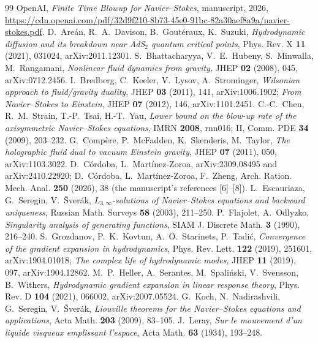 \begin{thebibliography}{99}
\small
{} OpenAI, \emph{Finite Time Blowup for Navier--Stokes}, manuscript, 2026, \url{https://cdn.openai.com/pdf/32d9f210-8b73-45e0-91bc-82a30aef8a9a/navier-stokes.pdf}.
 D.~Areán, R.~A.~Davison, B.~Goutéraux, K.~Suzuki, \emph{Hydrodynamic diffusion and its breakdown near AdS$_2$ quantum critical points}, Phys. Rev. X \textbf{11} (2021), 031024, arXiv:2011.12301.
 S.~Bhattacharyya, V.~E.~Hubeny, S.~Minwalla, M.~Rangamani, \emph{Nonlinear fluid dynamics from gravity}, JHEP \textbf{02} (2008), 045, arXiv:0712.2456.
 I.~Bredberg, C.~Keeler, V.~Lysov, A.~Strominger, \emph{Wilsonian approach to fluid/gravity duality}, JHEP \textbf{03} (2011), 141, arXiv:1006.1902; \emph{From Navier--Stokes to Einstein}, JHEP \textbf{07} (2012), 146, arXiv:1101.2451.
 C.-C.~Chen, R.~M.~Strain, T.-P.~Tsai, H.-T.~Yau, \emph{Lower bound on the blow-up rate of the axisymmetric Navier--Stokes equations}, IMRN \textbf{2008}, rnn016; II, Comm. PDE \textbf{34} (2009), 203--232.
 G.~Compère, P.~McFadden, K.~Skenderis, M.~Taylor, \emph{The holographic fluid dual to vacuum Einstein gravity}, JHEP \textbf{07} (2011), 050, arXiv:1103.3022.
 D.~Córdoba, L.~Martínez-Zoroa, arXiv:2309.08495 and arXiv:2410.22920; D.~Córdoba, L.~Martínez-Zoroa, F.~Zheng, Arch. Ration. Mech. Anal. \textbf{250} (2026), 38 (the manuscript's references [6]--[8]).
 L.~Escauriaza, G.~Seregin, V.~Šverák, \emph{$L_{3,\infty}$-solutions of Navier--Stokes equations and backward uniqueness}, Russian Math. Surveys \textbf{58} (2003), 211--250.
 P.~Flajolet, A.~Odlyzko, \emph{Singularity analysis of generating functions}, SIAM J. Discrete Math. \textbf{3} (1990), 216--240.
 S.~Grozdanov, P.~K.~Kovtun, A.~O.~Starinets, P.~Tadić, \emph{Convergence of the gradient expansion in hydrodynamics}, Phys. Rev. Lett. \textbf{122} (2019), 251601, arXiv:1904.01018; \emph{The complex life of hydrodynamic modes}, JHEP \textbf{11} (2019), 097, arXiv:1904.12862.
 M.~P.~Heller, A.~Serantes, M.~Spaliński, V.~Svensson, B.~Withers, \emph{Hydrodynamic gradient expansion in linear response theory}, Phys. Rev. D \textbf{104} (2021), 066002, arXiv:2007.05524.
 G.~Koch, N.~Nadirashvili, G.~Seregin, V.~Šverák, \emph{Liouville theorems for the Navier--Stokes equations and applications}, Acta Math. \textbf{203} (2009), 83--105.
 J.~Leray, \emph{Sur le mouvement d'un liquide visqueux emplissant l'espace}, Acta Math. \textbf{63} (1934), 193--248.

\end{thebibliography}
